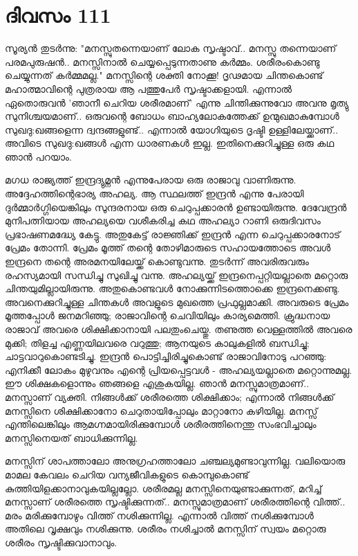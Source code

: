  
\section{ദിവസം 111}


സൂര്യന്‍ തുടര്‍ന്നു: "മനസ്സുതന്നെയാണ്‌ ലോക സൃഷ്ടാവ്‌.. മനസ്സു തന്നെയാണ്‌ പരമപുരുഷന്‍.. മനസ്സിനാല്‍ ചെയ്യപ്പെടുന്നതാണു കര്‍മ്മം. ശരീരംകൊണ്ടു ചെയ്യുന്നത്‌ കര്‍മ്മമല്ല." മനസ്സിന്റെ ശക്തി നോക്കൂ! ദൃഢമായ ചിന്തകൊണ്ട്‌ മഹാത്മാവിന്റെ പുത്രരായ ആ പത്തുപേര്‍ സൃഷ്ടാക്കളായി. എന്നാല്‍ ഏതൊരുവന്‍ 'ഞാനീ ചെറിയ ശരീരമാണ്‌' എന്നു ചിന്തിക്കുന്നുവോ അവനു മൃത്യു സുനിശ്ചയമാണ്‌.. ഒരുവന്റെ ബോധം ബാഹ്യലോകത്തേക്ക്‌ ഉന്മുഖമാകുമ്പോള്‍ സുഖദു:ഖങ്ങളെന്ന ദ്വന്ദങ്ങളുണ്ട്‌.. എന്നാല്‍ യോഗിയുടെ ദൃഷ്ടി ഉള്ളിലേയ്ക്കാണ്‌.. അവിടെ സുഖദു:ഖങ്ങള്‍ എന്ന ധാരണകള്‍ ഇല്ല. ഇതിനെക്കുറിച്ചുള്ള ഒരു കഥ ഞാന്‍ പറയാം.

മഗധ രാജ്യത്ത്‌ ഇന്ദ്രദ്യുമ്നന്‍ എന്നുപേരായ ഒരു രാജാവു വാണിരുന്നു. അദ്ദേഹത്തിന്റെഭാര്യ അഹല്യ. ആ സ്ഥലത്ത്‌ ഇന്ദ്രന്‍ എന്നു പേരായി ദുര്‍മ്മാര്‍ഗ്ഗിയെങ്കിലും സുന്ദരനായ ഒരു ചെറുപ്പക്കാരന്‍ ഉണ്ടായിരുന്നു. ദേവേന്ദ്രന്‍ മുനിപത്നിയായ അഹല്യയെ വശീകരിച്ച കഥ അഹല്യാ റാണി ഒരുദിവസം പ്രഭാഷണമദ്ധ്യേ കേട്ടു. അതുകേട്ട്‌ രാജ്ഞിക്ക്‌ ഇന്ദ്രന്‍ എന്ന ചെറുപ്പക്കാരനോട്‌ പ്രേമം തോന്നി. പ്രേമം മൂത്ത്‌ തന്റെ തോഴിമാരുടെ സഹായത്തോടെ അവള്‍ ഇന്ദ്രനെ തന്റെ അരമനയിലേയ്ക്ക്‌ കൊണ്ടുവന്നു. തുടര്‍ന്ന് അവരിരുവരും രഹസ്യമായി സന്ധിച്ചു സുഖിച്ചു വന്നു. അഹല്യയ്ക്ക്‌ ഇന്ദ്രനെപ്പറ്റിയല്ലാതെ മറ്റൊരു ചിന്തയുമില്ലായിരുന്നു. അതുകൊണ്ടവള്‍ നോക്കുന്നിടത്തൊക്കെ ഇന്ദ്രനെക്കണ്ടു. അവനെക്കുറിച്ചുള്ള ചിന്തകള്‍ അവളുടെ മുഖത്തെ പ്രഫുല്ലമാക്കി. അവരുടെ പ്രേമം മൂത്തപ്പോള്‍ ജനമറിഞ്ഞു; രാജാവിന്റെ ചെവിയിലും കാര്യമെത്തി. ക്രുദ്ധനായ രാജാവ്‌ അവരെ ശിക്ഷിക്കാനായി പലതുംചെയ്തു. തണുത്ത വെള്ളത്തില്‍ അവരെ മുക്കി; തിളച്ച എണ്ണയിലവരെ വറുത്തു; ആനയുടെ കാലുകളില്‍ ബന്ധിച്ചു; ചാട്ടവാറുകൊണ്ടടിച്ചു. ഇന്ദ്രന്‍ പൊട്ടിച്ചിരിച്ചുകൊണ്ട്‌ രാജാവിനോടു പറഞ്ഞു: എനിക്കീ ലോകം മുഴുവനും എന്റെ പ്രിയപ്പെട്ടവള്‍ - അഹല്യയല്ലാതെ മറ്റൊന്നുമല്ല. ഈ ശിക്ഷകളൊന്നും ഞങ്ങളെ എശുകയില്ല. ഞാന്‍ മനസ്സുമാത്രമാണ്‌.. മനസ്സാണ്‌ വ്യക്തി. നിങ്ങള്‍ക്ക്‌ ശരീരത്തെ ശിക്ഷിക്കാം; എന്നാല്‍ നിങ്ങള്‍ക്ക്‌ മനസ്സിനെ ശിക്ഷിക്കാനോ ചെറുതായിപ്പോലും മാറ്റാനോ കഴിയില്ല. മനസ്സ്‌ എന്തിലെങ്കിലും ആമഗ്നമായിരിക്കുമ്പോള്‍ ശരീരത്തിനെന്തു സംഭവിച്ചാലും മനസ്സിനെയത്‌ ബാധിക്കുന്നില്ല.

മനസ്സിന്‌ ശാപത്താലോ അനുഗ്രഹത്താലോ ചഞ്ചല്യമുണ്ടാവുന്നില്ല. വലിയൊരു മാമല കേവലം ചെറിയ വന്യജീവികളുടെ കൊമ്പുകൊണ്ട്‌ കുത്തിയിളക്കാനാവുകയില്ലല്ലോ. ശരീരമല്ല മനസ്സിനെയുണ്ടാക്കുന്നത്‌, മറിച്ച്‌ മനസ്സാണ്‌ ശരീരത്തെ സൃഷ്ടിക്കുന്നത്‌.. മനസ്സുമാത്രമാണ്‌ ശരീരത്തിന്റെ വിത്ത്‌.. മരം മരിക്കുമ്പോഴും വിത്ത്‌ നശിക്കുന്നില്ല. എന്നാല്‍ വിത്ത്‌ നശിക്കുമ്പോള്‍ അതിലെ വൃക്ഷവും നശിക്കുന്നു. ശരീരം നശിച്ചാല്‍ മനസ്സിന്‌ സ്വയം മറ്റൊരു ശരീരം സൃഷ്ടിക്കുവാനാവും. 

